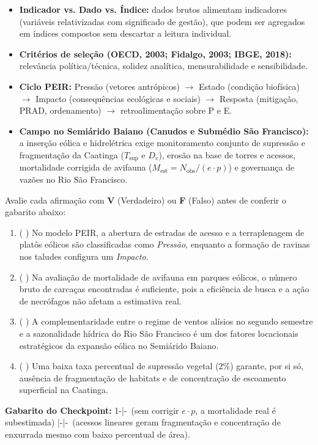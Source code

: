 \begin{boxResumo}
\begin{itemize}[leftmargin=1.4em, itemsep=2.5pt]
  \item \textbf{Indicador vs. Dado vs. Índice:} dados brutos alimentam indicadores (variáveis relativizadas com significado de gestão), que podem ser agregados em índices compostos sem descartar a leitura individual.
  \item \textbf{Critérios de seleção (OECD, 2003; Fidalgo, 2003; IBGE, 2018):} relevância política/técnica, solidez analítica, mensurabilidade e sensibilidade.
  \item \textbf{Ciclo PEIR:} Pressão (vetores antrópicos) $\rightarrow$ Estado (condição biofísica) $\rightarrow$ Impacto (consequências ecológicas e sociais) $\rightarrow$ Resposta (mitigação, PRAD, ordenamento) $\rightarrow$ retroalimentação sobre P e E.
  \item \textbf{Campo no Semiárido Baiano (Canudos e Submédio São Francisco):} a inserção eólica e hidrelétrica exige monitoramento conjunto de supressão e fragmentação da Caatinga ($T_{\text{sup}}$ e $D_v$), erosão na base de torres e acessos, mortalidade corrigida de avifauna ($M_{\text{est}} = N_{\text{obs}}/(e\cdot p)$) e governança de vazões no Rio São Francisco.
\end{itemize}
\end{boxResumo}

\begin{boxTeste}
Avalie cada afirmação com \textbf{V} (Verdadeiro) ou \textbf{F} (Falso) antes de conferir o gabarito abaixo:
\begin{enumerate}[leftmargin=1.6em, itemsep=3pt]
  \item ( \quad ) No modelo PEIR, a abertura de estradas de acesso e a terraplenagem de platôs eólicos são classificadas como \textit{Pressão}, enquanto a formação de ravinas nos taludes configura um \textit{Impacto}.
  \item ( \quad ) Na avaliação de mortalidade de avifauna em parques eólicos, o número bruto de carcaças encontradas é suficiente, pois a eficiência de busca e a ação de necrófagos não afetam a estimativa real.
  \item ( \quad ) A complementaridade entre o regime de ventos alísios no segundo semestre e a sazonalidade hídrica do Rio São Francisco é um dos fatores locacionais estratégicos da expansão eólica no Semiárido Baiano.
  \item ( \quad ) Uma baixa taxa percentual de supressão vegetal ($2\%$) garante, por si só, ausência de fragmentação de habitats e de concentração de escoamento superficial na Caatinga.
\end{enumerate}
\vspace{4pt}
{\footnotesize\textbf{Gabarito do Checkpoint:} 1-\V \quad|-\F\ (sem corrigir $e \cdot p$, a mortalidade real é subestimada) \quad|-\V \quad|-\F\ (acessos lineares geram fragmentação e concentração de enxurrada mesmo com baixo percentual de área).}
\end{boxTeste}
